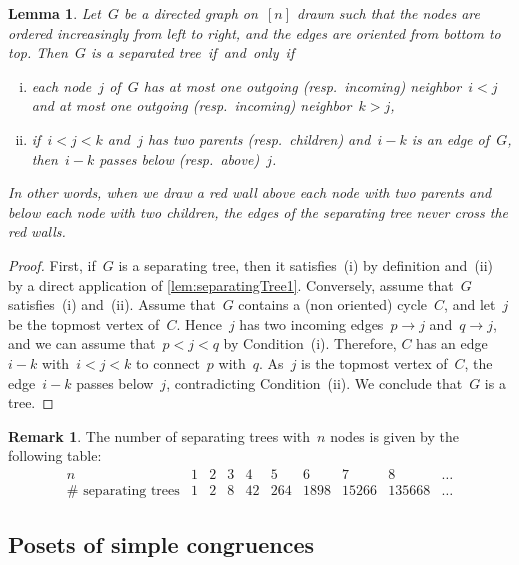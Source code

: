 \documentclass{amsart}
\newtheorem{lemma}[theorem]{Lemma}
\theoremstyle{definition}
\newtheorem{remark}[theorem]{Remark}
\newcommand{\vincent}[1]{\todo[color=blue!30]{#1 \\ \hfill --- V.}}
\begin{document}
\begin{lemma}
\label{lem:separatingTree2}
Let~$G$ be a directed graph on~$[n]$ drawn such that the nodes are ordered increasingly from left to right, and the edges are oriented from bottom to top.
Then~$G$ is a separated tree~if~and~only~if
\begin{enumerate}[(i)]
\item each node~$j$ of~$G$ has at most one outgoing (resp.~incoming) neighbor~$i < j$ and at most one outgoing (resp.~incoming) neighbor~$k > j$,
\item if~$i < j < k$ and~$j$ has two parents (resp.~children) and~$i-k$ is an edge of~$G$, then~$i-k$ passes below (resp.~above)~$j$.
\end{enumerate}
In other words, when we draw a red wall above each node with two parents and below each node with two children, the edges of the separating tree never cross the red walls.
\end{lemma}

\begin{proof}
First, if~$G$ is a separating tree, then it satisfies~(i) by definition and~(ii) by a direct application of \cref{lem:separatingTree1}.
Conversely, assume that~$G$ satisfies~(i) and~(ii).
Assume that~$G$ contains a (non oriented) cycle~$C$, and let~$j$ be the topmost vertex of~$C$.
Hence~$j$ has two incoming edges~$p \to j$ and~$q \to j$, and we can assume that~$p < j < q$ by Condition~(i).
Therefore, $C$ has an edge~$i-k$ with~$i < j < k$ to connect~$p$ with~$q$.
As~$j$ is the topmost vertex of~$C$, the edge~$i-k$ passes below~$j$, contradicting Condition~(ii).
We conclude that~$G$ is a tree.
\vincent{todo: close this proof}
\end{proof}

\begin{remark}
The number of separating trees with~$n$ nodes is given by the following table:
\[
\begin{array}{c|ccccccccc}
n & 1 & 2 & 3 & 4 & 5 & 6 & 7 & 8 & \dots \\
\hline
\#\text{ separating trees} & 1 & 2 & 8 & 42 & 264 & 1898 & 15266 & 135668 & \dots
\end{array}
\]
\end{remark}


\subsection{Posets of simple congruences}
\label{subsec:posetsSimpleCongruences}
\end{document}
